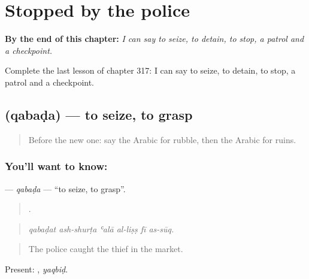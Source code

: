 
\chapter{Stopped by the police}
\label{ch:ar-stopped-by-the-police}

\begin{chapteropening}
\textbf{By the end of this chapter:} \emph{I can say to seize, to detain, to stop, a patrol and a checkpoint.}

Complete the last lesson of chapter 317: I can say to seize, to detain, to stop, a patrol and a checkpoint.
\end{chapteropening}

\section[\texorpdfstring{\ar{قبض} (qabaḍa)}{قبض (qabaḍa)}]{ (qabaḍa) — to seize, to grasp}

\label{lesson:AR-C317-qabada}



\begin{quote}
Before the new one: say the Arabic for rubble, then the Arabic for ruins.
\end{quote}

\subsection*{You'll want to know: }
\textbf{} — \emph{qabaḍa} — \textquotedblleft{}to seize, to grasp\textquotedblright{}.

\begin{quote}
     .
\end{quote}

\begin{quote}
\emph{qabaḍat ash-shurṭa ʿalā al-liṣṣ fī as-sūq.}
\end{quote}

\begin{quote}
The police caught the thief in the market.
\end{quote}

Present: , \emph{yaqbiḍ}.

